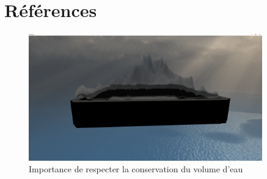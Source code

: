 \documentclass[a4paper, 12pt]{article} %
\begin{document}
\section{Références}
\begin{figure}
	\centering
	\includegraphics[width=0.9\textwidth]{./PhotoRapport/WaterConservation.png}
	\caption{Importance de respecter la conservation du volume d'eau}
	\label{WaterConservation}
\end{figure}
\end{document}
